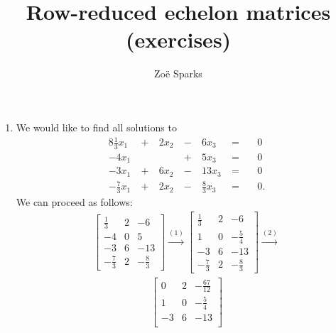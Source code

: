 \documentclass[12pt]{article}
\title{Row-reduced echelon matrices (exercises)}
\author{Zoë Sparks}
\begin{document}
\theoremstyle{definition}

\newtheorem{thm}{Theorem}
\newtheorem*{nthm}{Theorem}
\newtheorem{sthm}{}[thm]
\newtheorem{lemma}{Lemma}[thm]
\newtheorem{cor}{Corollary}[thm]
\newtheorem*{prop}{Property}
\newtheorem*{defn}{Definition}
\newtheorem*{comm}{Comment}
\newtheorem*{exm}{Example}

\maketitle

\begin{enumerate}
  \item
    We would like to find all solutions to
    \begin{alignat*}{8}
      \frac{1}{3}x_1\  &+&\ 2x_2\ &-&\  6x_3\          &=&\ &0\\
      -4x_1\           & &        &+&\  5x_3\          &=&\ &0\\
      -3x_1\           &+&\ 6x_2\ &-&\ 13x_3\          &=&\ &0\\
      -\frac{7}{3}x_1\ &+&\ 2x_2\ &-&\ \frac{8}{3}x_3\ &=&\ &0.
    \end{alignat*}
    We can proceed as follows:
    \begin{align*}
      \begin{bmatrix}
        \frac{1}{3}  & 2 & -6          \\
        -4           & 0 & 5           \\
        -3           & 6 & -13         \\
        -\frac{7}{3} & 2 & -\frac{8}{3}
      \end{bmatrix}
      \xrightarrow{(1)}
      \begin{bmatrix}
        \frac{1}{3}  & 2 & -6          \\
        1            & 0 & -\frac{5}{4}\\
        -3           & 6 & -13         \\
        -\frac{7}{3} & 2 & -\frac{8}{3}
      \end{bmatrix}
      \xrightarrow{(2)}
    \end{align*}
    \begin{align*}
      \begin{bmatrix}
        0            & 2 & -\frac{67}{12}\\
        1            & 0 & -\frac{5}{4}  \\
        -3           & 6 & -13           \\

\end{bmatrix}
\end{align*}
\end{enumerate}
\end{document}
